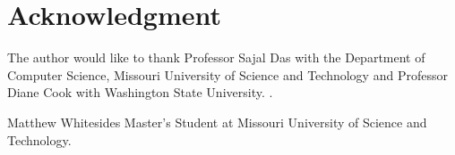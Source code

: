 \documentclass[journal,onecolumn]{IEEEtran}
\begin{document}



\section*{Acknowledgment}
The author would like to thank Professor Sajal Das with the Department of Computer Science, Missouri University of Science and Technology and Professor Diane Cook with Washington State University. .

\ifCLASSOPTIONcaptionsoff
  \newpage
\fi




\begin{IEEEbiographynophoto}{Matthew Whitesides}
  Master's Student at Missouri University of Science and Technology.
\end{IEEEbiographynophoto}

\end{document}
